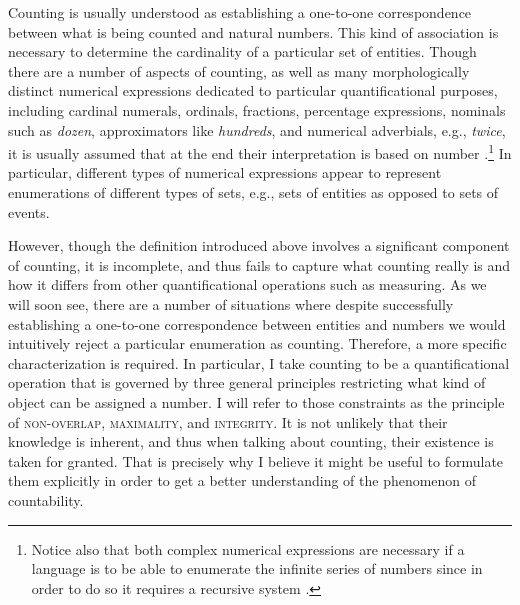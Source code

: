Counting is usually understood as establishing a one-to-one correspondence between what is being counted and natural numbers. This kind of association is necessary to determine the cardinality of a particular set of entities. Though there are a number of aspects of counting, as well as many morphologically distinct numerical expressions dedicated to particular quantificational purposes, including cardinal numerals, ordinals, fractions, percentage expressions, nominals such as \textit{dozen}, approximators like \textit{hundreds}, and numerical adverbials, e.g., \textit{twice}, it is usually assumed that at the end their interpretation is based on number \citep[see][]{rothstein2017semantics}.\footnote{Notice also that both complex numerical expressions are necessary if a language is to be able to enumerate the infinite series of numbers since in order to do so it requires a recursive system \citep[pp. 12--13]{rothstein2017semantics}.} In particular, different types of numerical expressions appear to represent enumerations of different types of sets, e.g., sets of entities as opposed to sets of events.

However, though the definition introduced above involves a significant component of counting, it is incomplete, and thus fails to capture what counting really is and how it differs from other quantificational operations such as measuring. As we will soon see, there are a number of situations where despite successfully establishing a one-to-one correspondence between entities and numbers we would intuitively reject a particular enumeration as counting. Therefore, a more specific characterization is required. In particular, I take counting to be a quantificational operation that is governed by three general principles restricting what kind of object can be assigned a number. I will refer to those constraints as the principle of \textsc{non-overlap}, \textsc{maximality}, and \textsc{integrity}. It is not unlikely that their knowledge is inherent, and thus when talking about counting, their existence is taken for granted. That is precisely why I believe it might be useful to formulate them explicitly in order to get a better understanding of the phenomenon of countability. 

